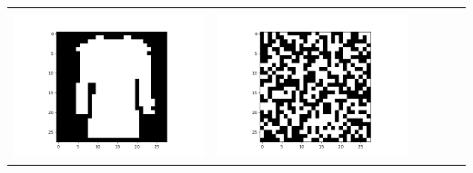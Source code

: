 \documentclass[12pt]{report}
\begin{document}
\begin{table}[H]
\begin{tabular}{  c  c  c  c  c  c }
\begin{minipage}{.15\textwidth}
    \end{minipage} \\ 
    \begin{minipage}{.15\textwidth}
      \includegraphics[scale=0.2]{BM_cvisual.png}
    \end{minipage} & 
    \begin{minipage}{.15\textwidth}
      \includegraphics[scale=0.2]{BM_c1.png}
    \end{minipage} &
    \begin{minipage}{.15\textwidth}

\end{minipage}
\end{tabular}
\end{table}
\end{document}
